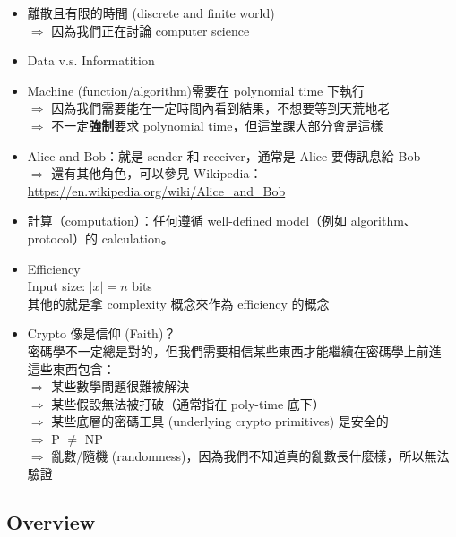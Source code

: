 \begin{itemize}[itemsep=10pt]
	\item 離散且有限的時間 (discrete and finite world) \\
		\(\Rightarrow\) 因為我們正在討論 computer science
		
	\item Data v.s. Informatition
	
	\item Machine (function/algorithm)需要在 polynomial time 下執行 \\
		\(\Rightarrow\) 因為我們需要能在一定時間內看到結果，不想要等到天荒地老 \\
		\(\Rightarrow\) 不一定\textbf{強制}要求 polynomial time，但這堂課大部分會是這樣
		
	\item Alice and Bob：就是 sender 和 receiver，通常是 Alice 要傳訊息給 Bob \\
		\(\Rightarrow\) 還有其他角色，可以參見 Wikipedia： \\
		\url{https://en.wikipedia.org/wiki/Alice_and_Bob}
		
	\item 計算（computation）：任何遵循 well-defined model（例如 algorithm、protocol）的 calculation。
	
	\item Efficiency \\
		Input size: \(|x| = n\) bits \\
		其他的就是拿 complexity 概念來作為 efficiency 的概念
		
	\item Crypto 像是信仰 (Faith)？ \\
		密碼學不一定總是對的，但我們需要相信某些東西才能繼續在密碼學上前進 \\
		這些東西包含： \\ 
		\(\Rightarrow\) 某些數學問題很難被解決 \\
		\(\Rightarrow\) 某些假設無法被打破（通常指在 poly-time 底下） \\
		\(\Rightarrow\) 某些底層的密碼工具 (underlying crypto primitives) 是安全的 \\
		\(\Rightarrow\) P \(\neq\) NP \\
		\(\Rightarrow\) 亂數/隨機 (randomness)，因為我們不知道真的亂數長什麼樣，所以無法驗證
\end{itemize}


\subsection{Overview}


